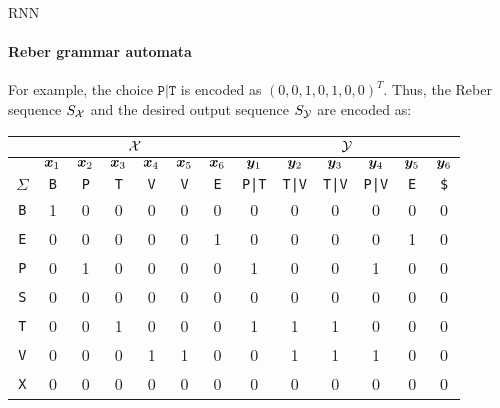 \begin{frame}{RNN}
\framesubtitle{Reber grammar automata}

For example, the choice $\texttt{P|T}$ is encoded
    as $(0,0,1,0,1,0,0)^T$. Thus, the Reber sequence $S_{\mathcal X}$ and the
    desired output sequence $S_{\mathcal Y}$ are encoded as:
    \begin{center}
        \begin{tabular}{|c|cccccc||cccccc|}
            \hline
        & \multicolumn{6}{c||}{${\mathcal X}$} & \multicolumn{6}{c|}{${\mathcal Y}$}\\
            \hline
            & ${\boldsymbol x}_1$ & ${\boldsymbol x}_2$ & ${\boldsymbol x}_3$ & ${\boldsymbol x}_4$ & ${\boldsymbol x}_5$ & ${\boldsymbol x}_6$
            & ${\boldsymbol y}_1$ & ${\boldsymbol y}_2$ & ${\boldsymbol y}_3$ & ${\boldsymbol y}_4$ & ${\boldsymbol y}_5$ & ${\boldsymbol y}_6$\\
            \hline
            $\Sigma$ & \texttt{B} & \texttt{P} & \texttt{T} & \texttt{V} &
            \texttt{V} & \texttt{E} & 
            \texttt{P|T} & \texttt{T|V} & \texttt{T|V} & \texttt{P|V} &
            \texttt{E}& \texttt{\$} \\
            \hline
            \texttt{B} & 1 & 0 & 0 & 0 & 0 & 0 & 0 & 0 & 0 & 0 & 0 & 0\\
            \texttt{E} & 0 & 0 & 0 & 0 & 0 & 1 & 0 & 0 & 0 & 0 & 1 & 0\\
            \texttt{P} & 0 & 1 & 0 & 0 & 0 & 0 & 1 & 0 & 0 & 1 & 0 & 0\\
            \texttt{S} & 0 & 0 & 0 & 0 & 0 & 0 & 0 & 0 & 0 & 0 & 0 & 0\\
            \texttt{T} & 0 & 0 & 1 & 0 & 0 & 0 & 1 & 1 & 1 & 0 & 0 & 0\\
            \texttt{V} & 0 & 0 & 0 & 1 & 1 & 0 & 0 & 1 & 1 & 1 & 0 & 0\\
            \texttt{X} & 0 & 0 & 0 & 0 & 0 & 0 & 0 & 0 & 0 & 0 & 0 & 0\\
            \hline
        \end{tabular}
    \end{center} 

\end{frame}

